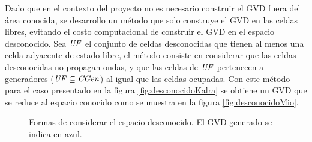 
Dado que en el contexto del proyecto no es necesario construir el GVD fuera del
área conocida, se desarrollo un método que solo construye el GVD en las celdas
libres, evitando el costo computacional de construir el GVD en el espacio
desconocido. Sea $\mathit{UF}$ el conjunto de celdas desconocidas que tienen al menos una
celda adyacente de estado libre, el método consiste en considerar que las
celdas desconocidas no propagan ondas, y que las celdas de $\mathit{UF}$
pertenecen a generadores ($\mathit{UF}\subseteq \mathit{CGen}$) al igual que las
celdas ocupadas. Con este método para el caso presentado en la figura
\ref{fig:desconocidoKalra} se obtiene un GVD que se reduce al espacio conocido
como se muestra en la figura \ref{fig:desconocidoMio}.

\begin{figure}[H]
  \centerfloat

  \quad

  \caption[Formas de considerar el espacio desconocido.]{Formas de considerar el espacio desconocido. El GVD generado se indica en azul.}\label{fig:desconocidoEj1}
\end{figure}

